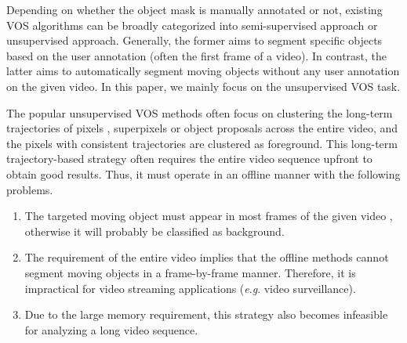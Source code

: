 \documentclass[journal]{IEEEtran}
\newcommand{\eg}{\textit{e}.\textit{g}. }
\begin{document}
Depending on whether the object mask is manually annotated or not, existing VOS algorithms can be broadly categorized into semi-supervised approach or unsupervised approach. Generally, the former \cite{CVPR2017_Khoreva,SIGGRAPH2015_Fan,CVPR2016_Maerki,CVPR2017_Caelles} aims to segment specific objects based on the user annotation (often the first frame of a video). In contrast, the latter \cite{ICCV2013_Papazoglou,CVPR2017_Tokmakov,CVPR2018_Li,ICCV2009_Sheikh,CVPR2012_Ochs,CVPR2016_Xiao} 
aims to automatically segment moving objects without any user annotation on the given video. In this paper, we mainly focus on the unsupervised VOS task.

The popular unsupervised VOS methods often focus on clustering the long-term trajectories of pixels \cite{CVPR2012_Ochs}, superpixels \cite{ICCV2013_Papazoglou,BMVC2014_Faktor,ECCV2014_Jain} or object proposals \cite{CVPR2016_Xiao,CVPR2015_Fragkiadaki,CVPR2017_Koh} across the entire video,
and the pixels with consistent trajectories are clustered as foreground.
This long-term trajectory-based strategy often requires the entire video sequence upfront to obtain good results.
Thus, it must operate in an offline manner with the following problems.
\begin{enumerate}
	\item The targeted moving object must appear in most frames of the given video \cite{ICCV2013_Papazoglou,CVPR2017_Koh}, otherwise it will probably be classified as background.
	\item The requirement of the entire video implies that the offline methods cannot segment moving objects in a frame-by-frame manner. Therefore, it is impractical for video streaming applications (\eg video surveillance).
	\item Due to the large memory requirement, this strategy also becomes infeasible for analyzing a long video sequence.
\end{enumerate}
\end{document}
